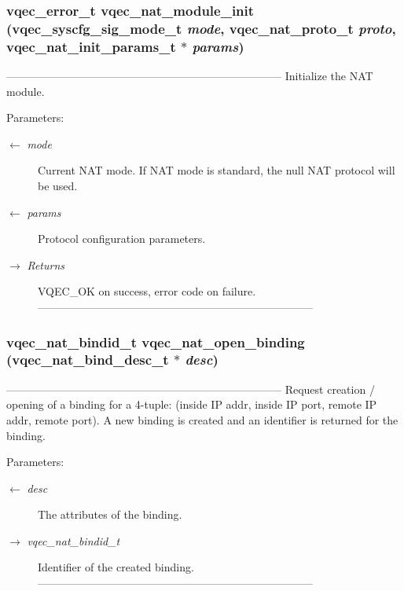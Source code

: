 \subsubsection{\setlength{\rightskip}{0pt plus 5cm}vqec\_\-error\_\-t vqec\_\-nat\_\-module\_\-init (\bf{vqec\_\-syscfg\_\-sig\_\-mode\_\-t} {\em mode}, vqec\_\-nat\_\-proto\_\-t {\em proto}, vqec\_\-nat\_\-init\_\-params\_\-t $\ast$ {\em params})}\label{vqec__nat__api_8c_83633147de37d3301648f68a352304ea}


--------------------------------------------------------------------------- Initialize the NAT module.

\begin{Desc}
\item[Parameters:]
\begin{description}
\item[\mbox{$\leftarrow$} {\em mode}]Current NAT mode. If NAT mode is standard, the null NAT protocol will be used. \item[\mbox{$\leftarrow$} {\em params}]Protocol configuration parameters. \item[\mbox{$\rightarrow$} {\em Returns}]VQEC\_\-OK on success, error code on failure. --------------------------------------------------------------------------- \end{description}
\end{Desc}
\subsubsection{\setlength{\rightskip}{0pt plus 5cm}vqec\_\-nat\_\-bindid\_\-t vqec\_\-nat\_\-open\_\-binding (vqec\_\-nat\_\-bind\_\-desc\_\-t $\ast$ {\em desc})}\label{vqec__nat__api_8c_c74d504ee5e09aabf2362fd74f414fb0}


--------------------------------------------------------------------------- Request creation / opening of a binding for a 4-tuple: (inside IP addr, inside IP port, remote IP addr, remote port). A new binding is created and an identifier is returned for the binding.

\begin{Desc}
\item[Parameters:]
\begin{description}
\item[\mbox{$\leftarrow$} {\em desc}]The attributes of the binding. \item[\mbox{$\rightarrow$} {\em vqec\_\-nat\_\-bindid\_\-t}]Identifier of the created binding. --------------------------------------------------------------------------- \end{description}
\end{Desc}
